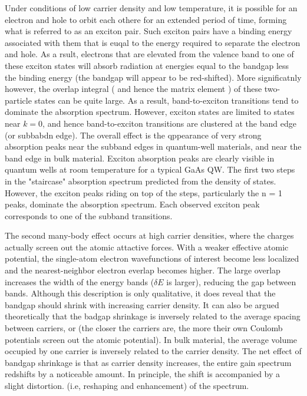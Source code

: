Under conditions of low carrier density and low temperature, it is possible for an electron and hole to orbit each othere for an extended period of time, forming what is referred to as an exciton pair. Such exciton pairs have a binding energy associated with them that is euqal to the energy required to separate the electron and hole. As a rsult, electrons that are elevated from the valence band to one of these exciton states will absorb radiation at energies equal to the bandgap less the binding energy (the bandgap will appear to be red-shifted). More significatnly however, the overlap integral ( and hence the matrix element ) of these two-particle states can be quite large. As a result, band-to-exciton transitions tend to dominate the absorption spectrum. However, exciton states are limited to states near $k = 0$, and hence band-to-exciton transitions are clustered at the band edge (or subbabdn edge). The overall effect is the qppearance of very strong absorption peaks near the subband edges in quantum-well materials, and near the band edge in bulk material.
Exciton absorption peaks are clearly visible in quantum wells at room temperature for a typical GaAs QW. The first two steps in the "staircase" absorption spectrum predicted from the density of states. However, the exciton peaks riding on top of the steps, particularly the n = 1 peaks, dominate the absorption spectrum. Each observed exciton peak corresponds to one of the subband transitions.

The second many-body effect occurs at high carrier densities, where the charges actually screen out the atomic attactive forces. With a weaker effective atomic potential, the single-atom electron wavefunctions of interest become less localized and the nearest-neighbor electron everlap becomes higher.  The large overlap increases the width of the energy bands ($\delta{E}$ is larger), reducing the gap between bands. Although this description is only qualitative, it does reveal that the bandgap should shrink with increasing carrier density.
It can also be argued theoretically that the badgap shrinkage is inversely related to the average spacing between carriers, or (the closer the carriers are, the more their own Coulomb potentials screen out the atomic potential). In bulk material, the average volume occupied by one carrier is inversely related to the carrier density. 
The net effect of bandgap shrinkage is that as carrier density increases, the entire gain spectrum redshifts by a noticeable amount. In principle, the shift is accompanied by a slight distortion. (i.e, reshaping and enhancement) of the spectrum.
